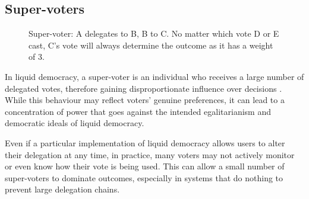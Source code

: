 \subsection*{Super-voters}
\begin{figure}[h]
  \centering
  \caption{Super-voter: A delegates to B, B to C. No matter which vote D or E cast, C's vote will always determine the outcome as it has a weight of 3.}
  \label{fig:delegation-supervoter}
\end{figure}
In liquid democracy, a super-voter is an individual who receives a large number of delegated votes, therefore gaining disproportionate influence over decisions \citep{kling2015votingbehaviourpoweronline}. While this behaviour may reflect voters' genuine preferences, it can lead to a concentration of power that goes against the intended egalitarianism and democratic ideals of liquid democracy.

Even if a particular implementation of liquid democracy allows users to alter their delegation at any time, in practice, many voters may not actively monitor or even know how their vote is being used. This can allow a small number of super-voters to dominate outcomes, especially in systems that do nothing to prevent large delegation chains.

